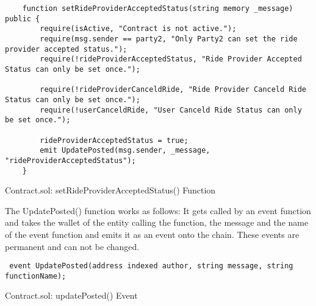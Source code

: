 \lstset{
  basicstyle=\footnotesize\ttfamily,
  breaklines=true,
  numbers=left,
  firstnumber=97
}
\begin{Listing}
\begin{lstlisting}
    function setRideProviderAcceptedStatus(string memory _message) public {
        require(isActive, "Contract is not active.");
        require(msg.sender == party2, "Only Party2 can set the ride provider accepted status.");
        require(!rideProviderAcceptedStatus, "Ride Provider Accepted Status can only be set once.");

        require(!rideProviderCanceldRide, "Ride Provider Canceld Ride Status can only be set once.");
        require(!userCanceldRide, "User Canceld Ride Status can only be set once.");

        rideProviderAcceptedStatus = true;
        emit UpdatePosted(msg.sender, _message, "rideProviderAcceptedStatus");
    }
\end{lstlisting}
  \caption{Contract.sol: setRideProviderAcceptedStatus() Function}
  \label{lst:setRideProviderAcceptedStatus}
\end{Listing}

The UpdatePosted() function works as follows: It gets called by an event function and takes the wallet of the entity calling the function, the message and the name of the event function and emits it as an event onto the chain. These events are permanent and can not be changed.

\lstset{
  basicstyle=\footnotesize\ttfamily,
  breaklines=true,
  numbers=left,
  firstnumber=94
}

\begin{Listing}
\begin{lstlisting}
 event UpdatePosted(address indexed author, string message, string functionName);
\end{lstlisting}
  \caption{Contract.sol: updatePosted() Event}
  \label{lst:updatePosted}
\end{Listing}

